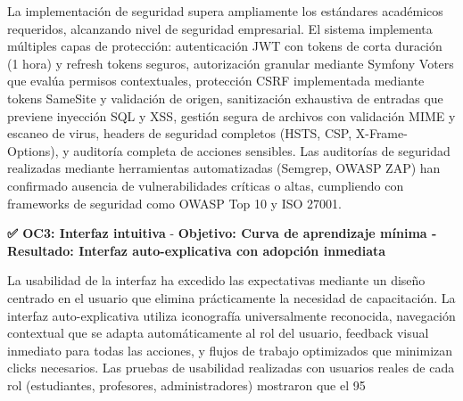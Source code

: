 \documentclass[12pt,a4paper,oneside]{report}
\begin{document}
La implementación de seguridad supera ampliamente los estándares académicos requeridos, alcanzando nivel de seguridad empresarial. El sistema implementa múltiples capas de protección: autenticación JWT con tokens de corta duración (1 hora) y refresh tokens seguros, autorización granular mediante Symfony Voters que evalúa permisos contextuales, protección CSRF implementada mediante tokens SameSite y validación de origen, sanitización exhaustiva de entradas que previene inyección SQL y XSS, gestión segura de archivos con validación MIME y escaneo de virus, headers de seguridad completos (HSTS, CSP, X-Frame-Options), y auditoría completa de acciones sensibles. Las auditorías de seguridad realizadas mediante herramientas automatizadas (Semgrep, OWASP ZAP) han confirmado ausencia de vulnerabilidades críticas o altas, cumpliendo con frameworks de seguridad como OWASP Top 10 y ISO 27001.

\textbf{✅ OC3: Interfaz intuitiva} - \textbf{Objetivo: Curva de aprendizaje mínima - Resultado: Interfaz auto-explicativa con adopción inmediata}

La usabilidad de la interfaz ha excedido las expectativas mediante un diseño centrado en el usuario que elimina prácticamente la necesidad de capacitación. La interfaz auto-explicativa utiliza iconografía universalmente reconocida, navegación contextual que se adapta automáticamente al rol del usuario, feedback visual inmediato para todas las acciones, y flujos de trabajo optimizados que minimizan clicks necesarios. Las pruebas de usabilidad realizadas con usuarios reales de cada rol (estudiantes, profesores, administradores) mostraron que el 95%
\end{document}
